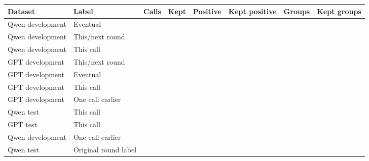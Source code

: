 \begin{tabular}{llrrrrrr}
\toprule
Dataset & Label & Calls & Kept & Positive & Kept positive & Groups & Kept groups \\
\midrule
Qwen development & Eventual & \coverageACalls{} & \coverageARetainedCalls{} & \coverageAPositives{} & \coverageARetainedPositives{} & \coverageAGroups{} & \coverageARetainedGroups{} \\
Qwen development & This/next round & \coverageBCalls{} & \coverageBRetainedCalls{} & \coverageBPositives{} & \coverageBRetainedPositives{} & \coverageBGroups{} & \coverageBRetainedGroups{} \\
Qwen development & This call & \coverageCCalls{} & \coverageCRetainedCalls{} & \coverageCPositives{} & \coverageCRetainedPositives{} & \coverageCGroups{} & \coverageCRetainedGroups{} \\
GPT development & This/next round & \coverageDCalls{} & \coverageDRetainedCalls{} & \coverageDPositives{} & \coverageDRetainedPositives{} & \coverageDGroups{} & \coverageDRetainedGroups{} \\
GPT development & Eventual & \coverageECalls{} & \coverageERetainedCalls{} & \coverageEPositives{} & \coverageERetainedPositives{} & \coverageEGroups{} & \coverageERetainedGroups{} \\
GPT development & This call & \coverageFCalls{} & \coverageFRetainedCalls{} & \coverageFPositives{} & \coverageFRetainedPositives{} & \coverageFGroups{} & \coverageFRetainedGroups{} \\
GPT development & One call earlier & \coverageGCalls{} & \coverageGRetainedCalls{} & \coverageGPositives{} & \coverageGRetainedPositives{} & \coverageGGroups{} & \coverageGRetainedGroups{} \\
Qwen test & This call & \coverageHCalls{} & \coverageHRetainedCalls{} & \coverageHPositives{} & \coverageHRetainedPositives{} & \coverageHGroups{} & \coverageHRetainedGroups{} \\
GPT test & This call & \coverageICalls{} & \coverageIRetainedCalls{} & \coverageIPositives{} & \coverageIRetainedPositives{} & \coverageIGroups{} & \coverageIRetainedGroups{} \\
Qwen development & One call earlier & \coverageJCalls{} & \coverageJRetainedCalls{} & \coverageJPositives{} & \coverageJRetainedPositives{} & \coverageJGroups{} & \coverageJRetainedGroups{} \\
Qwen test & Original round label & \coverageKCalls{} & \coverageKRetainedCalls{} & \coverageKPositives{} & \coverageKRetainedPositives{} & \coverageKGroups{} & \coverageKRetainedGroups{} \\
\bottomrule
\end{tabular}
